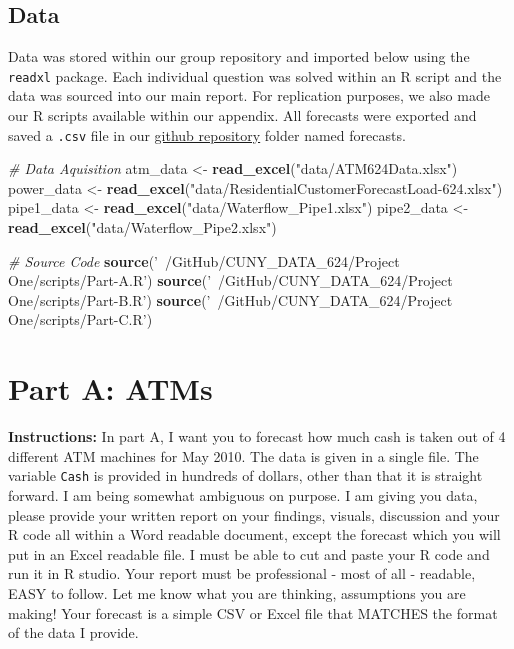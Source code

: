 \documentclass[openany]{book}
\newenvironment{Shaded}{\begin{snugshade}}{\end{snugshade}}
\newcommand{\CommentTok}[1]{\textcolor[rgb]{0.56,0.35,0.01}{\textit{#1}}}
\newcommand{\KeywordTok}[1]{\textcolor[rgb]{0.13,0.29,0.53}{\textbf{#1}}}
\newcommand{\NormalTok}[1]{#1}
\newcommand{\StringTok}[1]{\textcolor[rgb]{0.31,0.60,0.02}{#1}}
\renewenvironment{quote}{\begin{myquote}}{\end{myquote}}
\begin{document}
\hypertarget{data}{%
\section*{Data}\label{data}}

Data was stored within our group repository and imported below using the
\texttt{readxl} package. Each individual question was solved within an R
script and the data was sourced into our main report. For replication
purposes, we also made our R scripts available within our appendix. All
forecasts were exported and saved a \texttt{.csv} file in our
\href{https://github.com/JeremyOBrien16/CUNY_DATA_624/tree/master/Project\%20One/}{github
repository} folder named forecasts.

\begin{Shaded}
\begin{Highlighting}[]
\CommentTok{# Data Aquisition}
\NormalTok{atm_data <-}\StringTok{ }\KeywordTok{read_excel}\NormalTok{(}\StringTok{"data/ATM624Data.xlsx"}\NormalTok{) }
\NormalTok{power_data <-}\StringTok{ }\KeywordTok{read_excel}\NormalTok{(}\StringTok{"data/ResidentialCustomerForecastLoad-624.xlsx"}\NormalTok{) }
\NormalTok{pipe1_data <-}\StringTok{ }\KeywordTok{read_excel}\NormalTok{(}\StringTok{"data/Waterflow_Pipe1.xlsx"}\NormalTok{)}
\NormalTok{pipe2_data <-}\StringTok{ }\KeywordTok{read_excel}\NormalTok{(}\StringTok{"data/Waterflow_Pipe2.xlsx"}\NormalTok{)}

\CommentTok{# Source Code}
\KeywordTok{source}\NormalTok{(}\StringTok{'~/GitHub/CUNY_DATA_624/Project One/scripts/Part-A.R'}\NormalTok{)}
\KeywordTok{source}\NormalTok{(}\StringTok{'~/GitHub/CUNY_DATA_624/Project One/scripts/Part-B.R'}\NormalTok{)}
\KeywordTok{source}\NormalTok{(}\StringTok{'~/GitHub/CUNY_DATA_624/Project One/scripts/Part-C.R'}\NormalTok{)}
\end{Highlighting}
\end{Shaded}

\hypertarget{part-a-atms}{%
\chapter{Part A: ATMs}\label{part-a-atms}}

\begin{quote}
\textbf{Instructions:} In part A, I want you to forecast how much cash
is taken out of 4 different ATM machines for May 2010. The data is given
in a single file. The variable \texttt{Cash} is provided in hundreds of
dollars, other than that it is straight forward. I am being somewhat
ambiguous on purpose. I am giving you data, please provide your written
report on your findings, visuals, discussion and your R code all within
a Word readable document, except the forecast which you will put in an
Excel readable file. I must be able to cut and paste your R code and run
it in R studio. Your report must be professional - most of all -
readable, EASY to follow. Let me know what you are thinking, assumptions
you are making! Your forecast is a simple CSV or Excel file that MATCHES
the format of the data I provide.
\end{quote}
\end{document}
